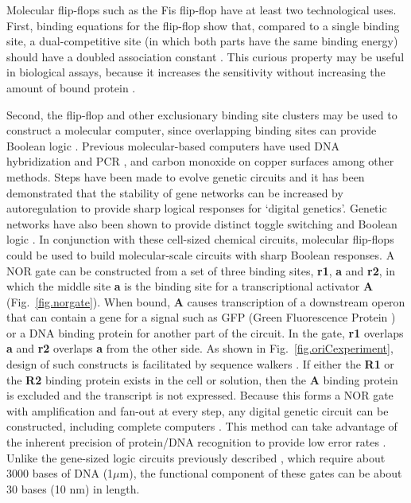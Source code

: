 \documentclass[doublespacing]{narfront}
\newcommand{\fig}[1]{Fig.~\ref{#1}} %
\newcommand{\figmargin}[1]{\marginpar{\textcolor{blue}{$\Leftarrow$Fig \ref{#1}}}}
\begin{document}
Molecular flip-flops such as the Fis flip-flop
have at least two technological uses.
First,
binding equations for the flip-flop show that,
compared to a single binding site,
a dual-competitive site
(in which both parts have the same binding energy)
should have a doubled association constant
\cite{Goodrich.McClure1992}.
This curious property may be useful in
biological assays, because it increases the sensitivity
without increasing the amount of bound protein
\cite{MOCO2004}.

Second,
the flip-flop and other exclusionary binding site clusters
may be used to construct a molecular computer, since
overlapping binding sites can provide Boolean logic
\cite{MOCO2004}.
Previous molecular-based computers have used
DNA hybridization
and PCR \cite{Adleman1994},
and
carbon monoxide on copper surfaces
\cite{Heinrich.Eigler2002}
among other methods.
Steps have been made to evolve genetic circuits
\cite{Yokobayashi.Arnold2002}
and
it has been demonstrated that
the stability of gene networks
can be increased by autoregulation
\cite{Becskei.Serrano2000} to provide sharp logical responses
for `digital genetics'.
Genetic networks have also
been shown to provide
distinct toggle switching
\cite{Monod.Jacob1961,Gardner.Collins2000}
and Boolean logic
\cite{Guet.Leibler2002}.
In conjunction with
these cell-sized chemical circuits,
molecular flip-flops could be used to build molecular-scale
circuits with sharp Boolean responses.
A NOR gate can be constructed from a set of three binding
sites, \textbf{r1}, \textbf{a} and \textbf{r2},
in which the middle site
\textbf{a} is the binding site for a transcriptional activator
\textbf{A}
\cite{MOCO2004}
(\fig{fig.norgate}).\figmargin{fig.norgate}
When bound, \textbf{A} causes transcription of a downstream operon
that can contain a gene for a signal such as GFP
(Green Fluorescence Protein \cite{Tsien1998})
or a DNA binding
protein for another part of the circuit.
In the gate,
\textbf{r1} overlaps \textbf{a} and \textbf{r2} overlaps \textbf{a}
from the other side.
As shown in
\fig{fig.oriCexperiment},
design of such constructs is facilitated by sequence walkers
\cite{Schneider.walker}.
If either the \textbf{R1} or the \textbf{R2}
binding protein exists in the cell or solution,
then the \textbf{A} binding protein is excluded and the transcript is not expressed.
Because this forms a NOR gate with
amplification
and fan-out
at every step,
any digital genetic circuit can be constructed,
including complete computers
\cite{Wait1967,Gersting1986,Schilling1989,Schneider.nano2}.
This method can take advantage of the
inherent precision of protein/DNA recognition
to provide low error rates
\cite{Shannon1949,Schneider.ccmm}.
Unlike the gene-sized logic circuits previously described
\cite{Guet.Leibler2002},
which require about 3000 bases of DNA (1$\mu$m),
the functional component of
these gates can be about 30 bases (10 nm) in length.
\end{document}

